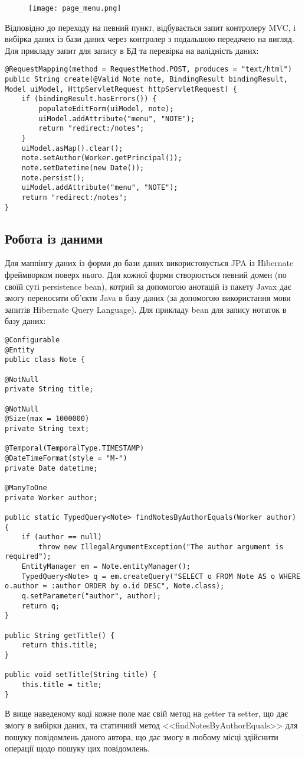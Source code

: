 \begin{figure}[!ht]
\centering
    \texttt{[image: page\_menu.png]}
    \label{pic:page_menu}
\end{figure}
\par Відповідно до переходу на певний пункт, відбувається запит контролеру MVC, і вибірка даних із бази даних через контролер з подальшою передачею на вигляд. Для прикладу запит для запису в БД та перевірка на валідність даних:
\begin{lstlisting}
@RequestMapping(method = RequestMethod.POST, produces = "text/html")
public String create(@Valid Note note, BindingResult bindingResult, Model uiModel, HttpServletRequest httpServletRequest) {
    if (bindingResult.hasErrors()) {
        populateEditForm(uiModel, note);
        uiModel.addAttribute("menu", "NOTE");
        return "redirect:/notes";
    }
    uiModel.asMap().clear();
    note.setAuthor(Worker.getPrincipal());
    note.setDatetime(new Date());
    note.persist();
    uiModel.addAttribute("menu", "NOTE");
    return "redirect:/notes";
}
\end{lstlisting}


\subsection{Робота із даними}
\par Для маппінгу даних із форми до бази даних використовується JPA із Hibernate фреймворком поверх нього. Для кожної форми створюється певний домен (по своїй суті persistence bean), котрий за допомогою анотацій із пакету Javax дає змогу переносити об'єкти Java в базу даних (за допомогою використання мови запитів Hibernate Query Language). Для прикладу bean для запису нотаток в базу даних:
\begin{lstlisting} 
@Configurable
@Entity
public class Note {

@NotNull
private String title;

@NotNull
@Size(max = 1000000)
private String text;

@Temporal(TemporalType.TIMESTAMP)
@DateTimeFormat(style = "M-")
private Date datetime;

@ManyToOne
private Worker author;

public static TypedQuery<Note> findNotesByAuthorEquals(Worker author) {
    if (author == null)
        throw new IllegalArgumentException("The author argument is required");
    EntityManager em = Note.entityManager();
    TypedQuery<Note> q = em.createQuery("SELECT o FROM Note AS o WHERE o.author = :author ORDER by o.id DESC", Note.class);
    q.setParameter("author", author);
    return q;
}

public String getTitle() {
    return this.title;
}

public void setTitle(String title) {
    this.title = title;
}
\end{lstlisting}
\par В вище наведеному коді кожне поле має свій метод на getter та setter, що дає змогу в вибірки даних, та статичний метод <<findNotesByAuthorEquals>> для пошуку повідомлень даного автора, що дає змогу в любому місці здійснити операції щодо пошуку цих повідомлень.

